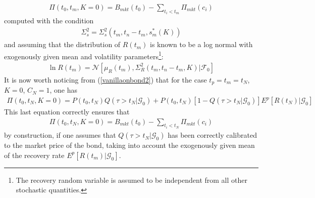 \documentclass[a4paper,10pt]{report}
\theoremstyle{plain}
\theoremstyle{definition}
\newcommand\be{\begin{eqnarray}}    %
\newcommand\ee{\end{eqnarray}}
\newcommand{\FF} {\mathcal{F} }
\newcommand{\GG} {\mathcal{G} }
\newcommand{\NN} {\mathcal{N}}
\begin{document}
\be
\label{calibmu} 
\Pi\left(t_0, t_m, K=0 \right)=B_{mkt}(t_0)-\sum_{t_i< t_m} \Pi_{mkt}\left(c_i\right)
\ee
computed with the condition 
\be 
\Sigma_s^2 = \Sigma_s^2\left(t_m, t_n-t_m, s_m^*(K)  \right)
\ee
and 
assuming that the distribution of $R(t_m)$ is known to be a log normal with exogenously given mean and volatility parameters\footnote{The recovery random variable is assumed to be independent from all other stochastic quantities.}:
\be 
\label{recoverydistr}
\ln R(t_m) = \NN\left[\mu_R(t_m), \Sigma_R^2\left(t_m, t_n-t_m, K \right) | \FF_0\right]
\ee
It is now worth noticing from (\ref{vanillaonbond2}) that for the case $t_p=t_m = t_N$, $K=0$, $C_N=1$, one has
\be 
\Pi\left(t_0, t_N, K=0 \right)=P(t_0, t_N)Q\left(\tau>t_N | \GG_0\right) + P(t_0, t_N)\left[1-Q\left(\tau>t_N | \GG_0\right)\right]E^p\left[ R(t_N) | \GG_0 \right]
\ee
This last equation correctly ensures that 
\be
\Pi\left(t_0, t_N, K=0 \right)=B_{mkt}(t_0)-\sum_{t_i< t_N} \Pi_{mkt}\left(c_i\right)
\ee
by construction, if one  assumes that $Q\left(\tau>t_N | \GG_0\right)$ has been correctly calibrated to the market price of the bond, taking into account the exogenously given mean of the recovery rate $E^p\left[ R(t_m) | \GG_0 \right]$.
\end{document}
